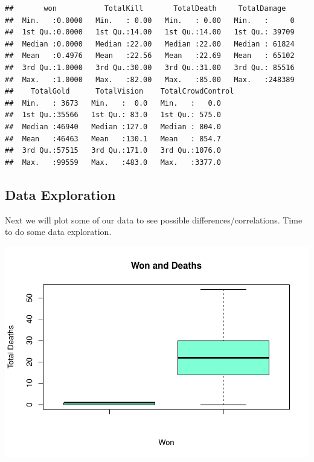\documentclass[
]{article}
\newenvironment{Shaded}{\begin{snugshade}}{\end{snugshade}}
\newcommand{\AttributeTok}[1]{\textcolor[rgb]{0.77,0.63,0.00}{#1}}
\newcommand{\ConstantTok}[1]{\textcolor[rgb]{0.00,0.00,0.00}{#1}}
\newcommand{\FunctionTok}[1]{\textcolor[rgb]{0.00,0.00,0.00}{#1}}
\newcommand{\NormalTok}[1]{#1}
\newcommand{\SpecialCharTok}[1]{\textcolor[rgb]{0.00,0.00,0.00}{#1}}
\newcommand{\StringTok}[1]{\textcolor[rgb]{0.31,0.60,0.02}{#1}}
\begin{document}
\begin{verbatim}
##       won           TotalKill       TotalDeath     TotalDamage    
##  Min.   :0.0000   Min.   : 0.00   Min.   : 0.00   Min.   :     0  
##  1st Qu.:0.0000   1st Qu.:14.00   1st Qu.:14.00   1st Qu.: 39709  
##  Median :0.0000   Median :22.00   Median :22.00   Median : 61824  
##  Mean   :0.4976   Mean   :22.56   Mean   :22.69   Mean   : 65102  
##  3rd Qu.:1.0000   3rd Qu.:30.00   3rd Qu.:31.00   3rd Qu.: 85516  
##  Max.   :1.0000   Max.   :82.00   Max.   :85.00   Max.   :248389  
##    TotalGold      TotalVision    TotalCrowdControl
##  Min.   : 3673   Min.   :  0.0   Min.   :   0.0   
##  1st Qu.:35566   1st Qu.: 83.0   1st Qu.: 575.0   
##  Median :46940   Median :127.0   Median : 804.0   
##  Mean   :46463   Mean   :130.1   Mean   : 854.7   
##  3rd Qu.:57515   3rd Qu.:171.0   3rd Qu.:1076.0   
##  Max.   :99559   Max.   :483.0   Max.   :3377.0
\end{verbatim}

\hypertarget{data-exploration}{%
\subsection{Data Exploration}\label{data-exploration}}

Next we will plot some of our data to see possible
differences/correlations. Time to do some data exploration.

\begin{Shaded}
\end{Shaded}

\includegraphics{Regression_files/figure-latex/unnamed-chunk-5-1.pdf}
\end{document}
